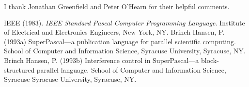 \acknowledgements

I thank Jonathan Greenfield and Peter O'Hearn for their
helpful comments.


\begin{mybibliography}{3}
  \entry
  IEEE (1983). {\it IEEE Standard Pascal Computer
  Programming Language}. Institute of Electrical and
  Electronics Engineers, New York, NY.
  \entry
  Brinch Hansen, P. (1993a) SuperPascal---a publication
  language for parallel scientific computing. School of
  Computer and Information Science, Syracuse University,
  Syracuse, NY.
  \entry
  Brinch Hansen, P. (1993b) Interference control in
  SuperPascal---a block-structured parallel language.
  School of Computer and Information Science, Syracuse
  Syracuse University, Syracuse, NY.
\end{mybibliography}


